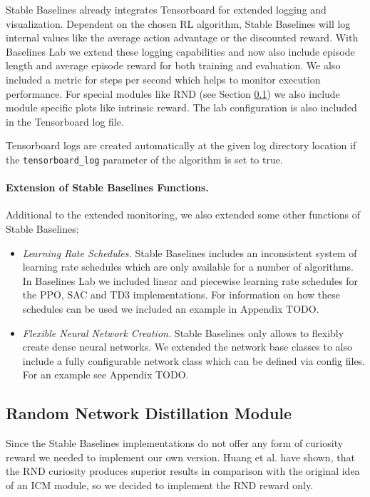 Stable Baselines already integrates Tensorboard for extended logging and visualization. Dependent on the chosen RL algorithm, Stable Baselines will log internal values like the average action advantage or the discounted reward. With Baselines Lab we extend these logging capabilities and now also include episode length and average episode reward for both training and evaluation. We also included a metric for steps per second which helps to monitor execution performance. For special modules like RND (see Section \ref{sec:blRND}) we also include module specific plots like intrinsic reward. The lab configuration is also included in the Tensorboard log file.

Tensorboard logs are created automatically at the given log directory location if the \texttt{tensorboard\_log} parameter of the algorithm is set to true.

\paragraph{Extension of Stable Baselines Functions.}
Additional to the extended monitoring, we also extended some other functions of Stable Baselines:

\begin{itemize}
    \item \textit{Learning Rate Schedules.} Stable Baselines includes an inconsistent system of learning rate schedules which are only available for a number of algorithms. In Baselines Lab we included linear and piecewise learning rate schedules for the PPO, SAC and TD3 implementations. For information on how these schedules can be used we included an example in Appendix TODO.
    \item \textit{Flexible Neural Network Creation.} Stable Baselines only allows to flexibly create dense neural networks. We extended the network base classes to also include a fully configurable network class which can be defined via config files. For an example see Appendix TODO.
\end{itemize}


\subsection{Random Network Distillation Module} \label{sec:blRND}
Since the Stable Baselines implementations do not offer any form of curiosity reward we needed to implement our own version. Huang et al. have shown, that the RND curiosity produces superior results in comparison with the original idea of an ICM module, so we decided to implement the RND reward only. 

